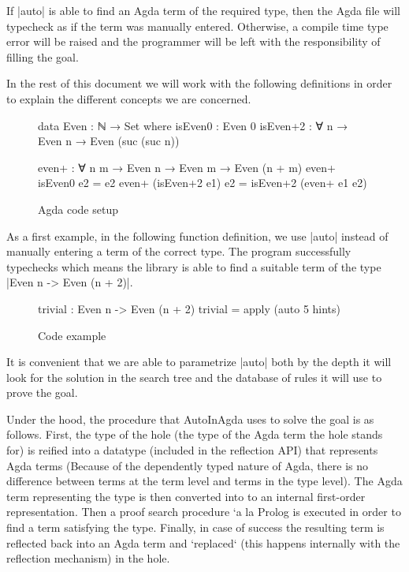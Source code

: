 \documentclass[a4paper]{article}
\begin{document}
If |auto| is able to find an Agda term of the required type, then the Agda file
will typecheck as if the term was manually entered. Otherwise, a compile time
type error will be raised and the programmer will be left with the
responsibility of filling the goal.

In the rest of this document we will work with the following definitions in
order to explain the different concepts we are concerned.

\begin{figure}[h]
\scriptsize
\centering
\begin{code}
 data Even  : ℕ →  Set where
    isEven0  : Even 0
    isEven+2 : ∀ {n} → Even n → Even (suc (suc n))

  even+ : ∀ {n m} → Even n → Even m → Even (n + m)
  even+  isEven0      e2 = e2
  even+ (isEven+2 e1) e2 = isEven+2 (even+ e1 e2)
\end{code}
  \caption{Agda code setup}
  \label{fig:agda_setup}
\end{figure}

As a first example, in the following function definition, we use |auto| instead 
of manually entering a term of the correct type. The program successfully
typechecks which means the library is able to find a suitable term of the type
|Even n -> Even (n + 2)|.

\begin{figure}[h]
\scriptsize
\centering
  \begin{code}
    trivial : Even n -> Even (n + 2)
    trivial = apply (auto 5 hints)
  \end{code}
  \caption{Code example}
  \label{fig:agda_trivial}
\end{figure}

\noindent

It is convenient that we are able to parametrize |auto| both by the depth it
will look for the solution in the search tree and the database of rules it will
use to prove the goal.

Under the hood, the procedure that AutoInAgda uses to solve the goal is as
follows.  First, the type of the hole (the type of the Agda term the hole stands
for) is reified into a datatype (included in the reflection API) that represents
Agda terms (Because of the dependently typed nature of Agda, there is no
difference between terms at the term level and terms in the type level). The
Agda term representing the type is then converted into to an internal
first-order representation. Then a proof search procedure `a la Prolog is
executed in order to find a term satisfying the type. Finally, in case of
success the resulting term is reflected back into an Agda term and `replaced`
(this happens internally with the reflection mechanism) in the hole.
\end{document}
